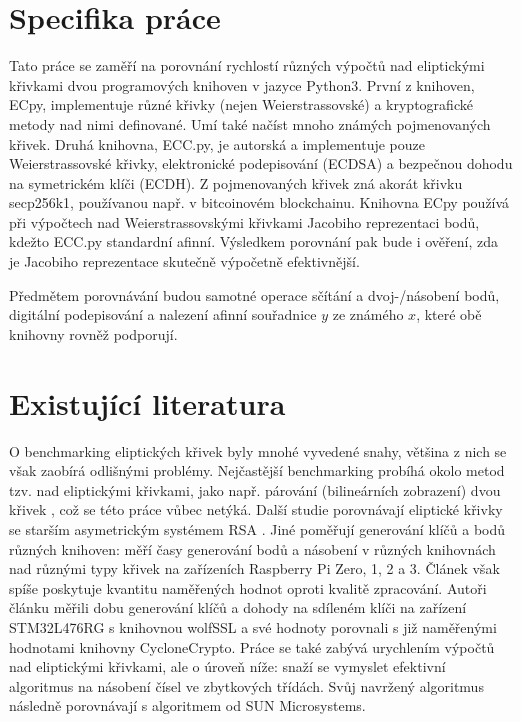 \documentclass{article}
\theoremstyle{definition}
\begin{document}
\section{Specifika práce}
Tato práce se zaměří na porovnání rychlostí různých výpočtů nad eliptickými křivkami dvou programových knihoven v jazyce Python3. První z knihoven, ECpy, implementuje různé křivky (nejen Weierstrassovské) a kryptografické metody nad nimi definované. Umí také načíst mnoho známých pojmenovaných křivek. Druhá knihovna, ECC.py, je autorská a implementuje pouze Weierstrassovské křivky, elektronické podepisování (ECDSA) a bezpečnou dohodu na symetrickém klíči (ECDH). Z pojmenovaných křivek zná akorát křivku secp256k1, používanou např. v bitcoinovém blockchainu. Knihovna ECpy používá při výpočtech nad Weierstrassovskými křivkami Jacobiho reprezentaci bodů, kdežto ECC.py standardní afinní. Výsledkem porovnání pak bude i ověření, zda je Jacobiho reprezentace skutečně výpočetně efektivnější.

Předmětem porovnávání budou samotné operace sčítání a dvoj-/násobení bodů, digitální podepisování a nalezení afinní souřadnice $y$ ze známého $x$, které obě knihovny rovněž podporují.

\section{Existující literatura}
O benchmarking eliptických křivek byly mnohé vyvedené snahy, většina z nich se však zaobírá odlišnými problémy. Nejčastější benchmarking probíhá okolo metod tzv.  nad eliptickými křivkami, jako např. párování (bilineárních zobrazení) dvou křivek \cite{bench-pair-ecc, snark-bench}, což se této práce vůbec netýká. Další studie porovnávají eliptické křivky se starším asymetrickým systémem RSA \cite{ecc-rsa-para-bench}. Jiné poměřují generování klíčů a bodů různých knihoven: \cite{vut-bench} měří časy generování bodů a násobení v různých knihovnách nad různými typy křivek na zařízeních Raspberry Pi Zero, 1, 2 a 3. Článek však spíše poskytuje kvantitu naměřených hodnot oproti kvalitě zpracování. Autoři článku \cite{ecdh-embedded-bench} měřili dobu generování klíčů a dohody na sdíleném klíči na zařízení STM32L476RG s knihovnou wolfSSL a své hodnoty porovnali s již naměřenými hodnotami knihovny CycloneCrypto. Práce \cite{mod-arti-bench} se také zabývá urychlením výpočtů nad eliptickými křivkami, ale o úroveň níže: snaží se vymyslet efektivní algoritmus na násobení čísel ve zbytkových třídách. Svůj navržený algoritmus následně porovnávají s algoritmem od SUN Microsystems.
\end{document}
